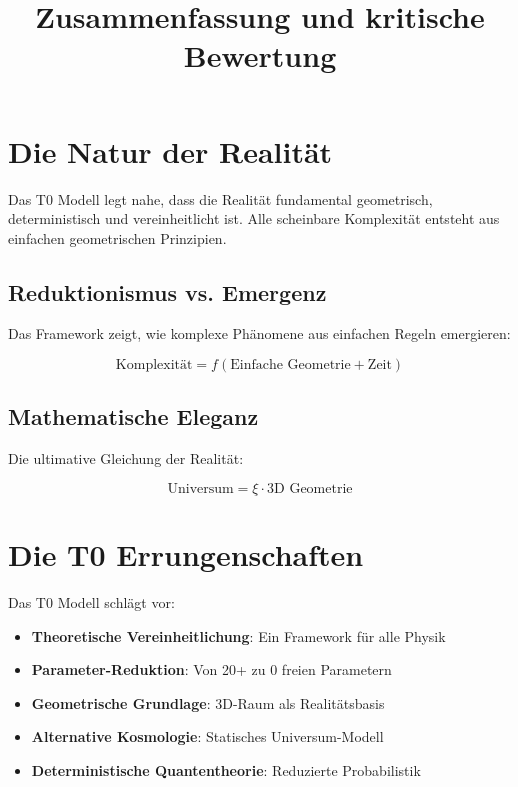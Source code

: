 \documentclass[12pt,a4paper]{report}
\begin{document}
	\section{Die Natur der Realität}
	
	\begin{erkenntnis}
		Das T0 Modell legt nahe, dass die Realität fundamental geometrisch, deterministisch und vereinheitlicht ist. Alle scheinbare Komplexität entsteht aus einfachen geometrischen Prinzipien.
	\end{erkenntnis}
	
	\subsection{Reduktionismus vs. Emergenz}
	
	Das Framework zeigt, wie komplexe Phänomene aus einfachen Regeln emergieren:
	
	\begin{equation}
		\text{Komplexität} = f(\text{Einfache Geometrie} + \text{Zeit})
	\end{equation}
	
	\subsection{Mathematische Eleganz}
	
	Die ultimative Gleichung der Realität:
	
	\begin{equation}
		\boxed{\text{Universum} = \xi \cdot \text{3D Geometrie}}
	\end{equation}
	
	\title{Zusammenfassung und kritische Bewertung}
\maketitle
	
	\section{Die T0 Errungenschaften}
	
	Das T0 Modell schlägt vor:
	
	\begin{itemize}
		\item \textbf{Theoretische Vereinheitlichung}: Ein Framework für alle Physik
		\item \textbf{Parameter-Reduktion}: Von 20+ zu 0 freien Parametern
		\item \textbf{Geometrische Grundlage}: 3D-Raum als Realitätsbasis
		\item \textbf{Alternative Kosmologie}: Statisches Universum-Modell
		\item \textbf{Deterministische Quantentheorie}: Reduzierte Probabilistik
	\end{itemize}
	
\end{document}
